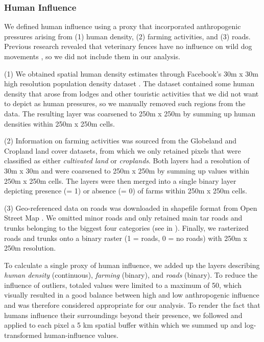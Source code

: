 \documentclass[abstract=on,10pt,a4paper,bibliography=totocnumbered]{scrartcl}
\begin{document}
\subsubsection{Human Influence}
We defined human influence using a proxy that incorporated anthropogenic
pressures arising from (1) human density, (2) farming activities, and (3) roads.
Previous research revealed that veterinary fences have no influence on wild dog
movements \citep{Cozzi.2013b}, so we did not include them in our analysis.

(1) We obtained spatial human density estimates through Facebook's 30m x 30m
high resolution population density dataset \citep{Facebook.2019}. The dataset
contained some human density that arose from lodges and other touristic
activities that we did not want to depict as human pressures, so we manually
removed such regions from the data. The resulting layer was coarsened to 250m x
250m by summing up human densities within 250m x 250m cells.

(2) Information on farming activities was sourced from the Globeland
\citep{Chen.2015} and Cropland \citep{Xiong.2017} land cover datasets, from
which we only retained pixels that were classified as either \textit{cultivated
land} or \textit{croplands}. Both layers had a resolution of 30m x 30m and were
coarsened to 250m x 250m by summing up values within 250m x 250m cells. The
layers were then merged into a single binary layer depicting presence (= 1) or
absence (= 0) of farms within 250m x 250m cells.

(3) Geo-referenced data on roads was downloaded in shapefile format from Open
Street Map \citep{OpenStreetMap.2019}. We omitted minor roads and only retained
main tar roads and trunks belonging to the biggest four categories (see
 in ). Finally, we
rasterized roads and trunks onto a binary raster (1 = roads, 0 = no roads) with
250m x 250m resolution.

To calculate a single proxy of human influence, we added up the layers
describing \textit{human density} (continuous), \textit{farming} (binary), and
\textit{roads} (binary). To reduce the influence of outliers, totaled values
were limited to a maximum of 50, which visually resulted in a good balance
between high and low anthropogenic influence and was therefore considered
appropriate for our analysis. To render the fact that humans influence their
surroundings beyond their presence, we followed \cite{Elliot.2014} and applied
to each pixel a 5 km spatial buffer within which we summed up and log-transformed
human-influence values.
\end{document}
